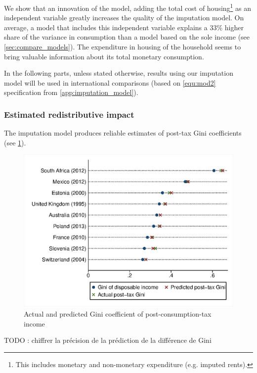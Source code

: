 \documentclass[12pt]{article}
\begin{document}
We show that an innovation of the model, adding the total cost of housing\footnote{This includes monetary and non-monetary expenditure (e.g. imputed rents).} as an independent variable greatly increases the quality of the imputation model. On average, a model that includes this independent variable explains a 33\% higher share of the variance in consumption than a model based on the sole income (see \cref{sec:compare_models}). The expenditure in housing of the household seems to bring valuable information about its total monetary consumption.

In the following parts, unless stated otherwise, results using our imputation model will be used in international comparisons (based on \eqref{equ:mod2} specification from \cref{app:imputation_model}).


\subsubsection{Estimated redistributive impact}
\label{sec:imputation_error}
The imputation model produces reliable estimates of post-tax Gini coefficients (see \cref{fig:prediction_error}). 
\begin{figure}
    \centering
    \includegraphics[height=0.45\textheight]{images/19-02_prediction_error_ours_mod2}
    \caption{Actual and predicted Gini coefficient of post-consumption-tax income}
    \label{fig:prediction_error}
\end{figure}

{\color{red} TODO : chiffrer la précision de la prédiction de la différence de Gini}
\end{document}
